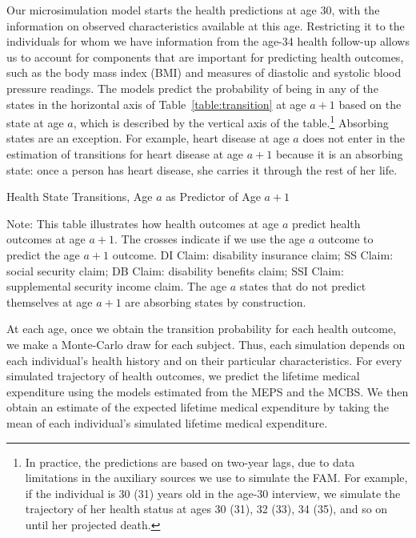 Our microsimulation model starts the health predictions at age 30, with the information on observed characteristics available at this age. Restricting it to the individuals for whom we have information from the age-34 health follow-up allows us to account for components that are important for predicting health outcomes, such as the body mass index (BMI) and measures of diastolic and systolic blood pressure readings. The models predict the probability of being in any of the states in the horizontal axis of Table~\ref{table:transition} at age $a+1$ based on the state at age $a$, which is described by the vertical axis of the table.\footnote{In practice, the predictions are based on two-year lags, due to data limitations in the auxiliary sources we use to simulate the FAM. For example, if the individual is 30 (31) years old in the age-30 interview, we simulate the trajectory of her health status at ages 30 (31), 32 (33), 34 (35), and so on until her projected death.} Absorbing states are an exception. For example, heart disease at age $a$ does not enter in the estimation of transitions for heart disease at age $a+1$ because it is an absorbing state: once a person has heart disease, she carries it through the rest of her life.

\begin{table}
\begin{threeparttable}
\caption{Health State Transitions, Age $a$ as Predictor of Age $a+1$}\label{table:transition}
\scriptsize

\begin{tablenotes}
\footnotesize
\item Note: This table illustrates how health outcomes at age $a$ predict health outcomes at age $a+1$. The crosses indicate if we use the age $a$ outcome to predict the age $a+1$ outcome. DI Claim: disability insurance claim; SS Claim: social security claim; DB Claim: disability benefits claim; SSI Claim: supplemental security income claim. The age $a$ states that do not predict themselves at age $a+1$ are absorbing states by construction.
\end{tablenotes}
\end{threeparttable}
\end{table}

At each age, once we obtain the transition probability for each health outcome, we make a Monte-Carlo draw for each subject. Thus, each simulation depends on each individual's health history and on their particular characteristics. For every simulated trajectory of health outcomes, we predict the lifetime medical expenditure using the models estimated from the MEPS and the MCBS. We then obtain an estimate of the expected lifetime medical expenditure by taking the mean of each individual's simulated lifetime medical expenditure.

